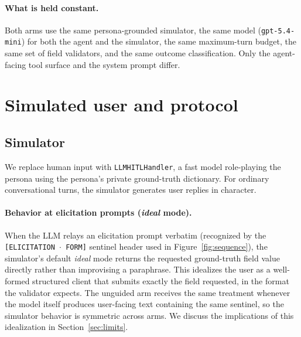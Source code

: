 \documentclass[11pt,a4paper]{article}
\begin{document}
\paragraph{What is held constant.}
Both arms use the same persona-grounded simulator, the same model (\texttt{gpt-5.4-mini}) for both the agent and the simulator, the same maximum-turn budget, the same set of field validators, and the same outcome classification. Only the agent-facing tool surface and the system prompt differ.

\section{Simulated user and protocol}
\label{sec:protocol}

\subsection{Simulator}

We replace human input with \texttt{LLMHITLHandler}, a fast model role-playing the persona using the persona's private ground-truth dictionary. For ordinary conversational turns, the simulator generates user replies in character.

\paragraph{Behavior at elicitation prompts (\emph{ideal} mode).}
When the LLM relays an elicitation prompt verbatim (recognized by the \texttt{[ELICITATION\,$\cdot$\,FORM]} sentinel header used in Figure~\ref{fig:sequence}), the simulator's default \emph{ideal} mode returns the requested ground-truth field value directly rather than improvising a paraphrase. This idealizes the user as a well-formed structured client that submits exactly the field requested, in the format the validator expects. The unguided arm receives the same treatment whenever the model itself produces user-facing text containing the same sentinel, so the simulator behavior is symmetric across arms. We discuss the implications of this idealization in Section~\ref{sec:limits}.
\end{document}
